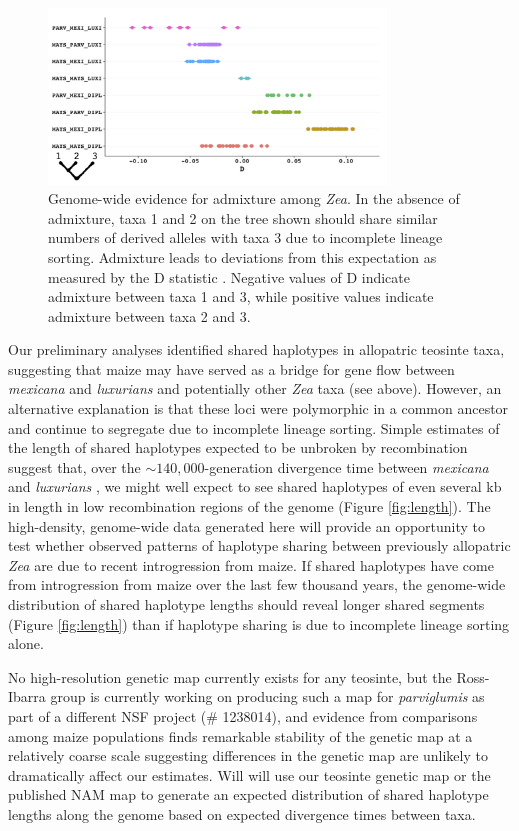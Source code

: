 \begin{figure}[]
  \centering
   \includegraphics[width=0.8\textwidth]{abbas}
    \caption{Genome-wide evidence for admixture among \emph{Zea}. In the absence of admixture, taxa 1 and 2 on the tree shown should share similar numbers of derived alleles with taxa 3 due to incomplete lineage sorting.  Admixture leads to deviations from this expectation as measured by the D statistic  \citep{green2010draft}. Negative values of D indicate admixture between taxa 1 and 3, while positive values indicate admixture between taxa 2 and 3.} 
\label{fig:abba}
\end{figure}


Our preliminary analyses identified shared haplotypes in allopatric teosinte taxa, suggesting that maize may have served as a bridge for gene flow between \emph{mexicana} and \emph{luxurians} and potentially other \emph{Zea} taxa (see above).  However, an alternative explanation is that these loci were polymorphic in a common ancestor and continue to segregate due to incomplete lineage sorting.
Simple estimates of the length of shared haplotypes expected to be unbroken by recombination suggest that, over the $\sim 140,000$-generation divergence time between \emph{mexicana} and \emph{luxurians} \citep{Ross-Ibarra2009a}, we might well expect to see shared haplotypes of even several kb in length in low recombination regions of the genome (Figure \ref{fig:length}).
The high-density, genome-wide data generated here will provide an opportunity to test whether observed patterns of haplotype sharing between previously allopatric \emph{Zea} are due to recent introgression from maize.  
If shared haplotypes have come from introgression from maize over the last few thousand years, the genome-wide distribution of shared haplotype lengths should reveal longer shared segments (Figure \ref{fig:length}) than if haplotype sharing is due to incomplete lineage sorting alone.

No high-resolution genetic map currently exists for any teosinte, but the Ross-Ibarra group is currently working on producing such a map for \emph{parviglumis} as part of a different NSF project (\# 1238014), and evidence from comparisons among maize populations finds remarkable stability of the genetic map at a relatively coarse scale \citep{bauer2013} suggesting differences in the genetic map are unlikely to dramatically affect our estimates. 
Will will use our teosinte genetic map or the published NAM map \citep{McMullen2009} to generate an expected distribution of shared haplotype lengths along the genome based on expected divergence times between taxa.

